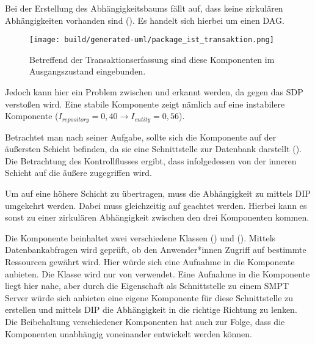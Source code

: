 Bei der Erstellung des Abhängigkeitsbaums fällt auf, dass keine zirkulären Abhängigkeiten vorhanden sind (). Es handelt sich hierbei um einen \ac{DAG}. 

\begin{figure}
  \centering
  \texttt{[image: build/generated-uml/package\_ist\_transaktion.png]}
   \caption{Betreffend der Transaktionserfassung sind diese Komponenten im Ausgangszustand eingebunden.}
   \label{fig:package_ist_transaktion}
\end{figure}

Jedoch kann hier ein Problem zwischen  und  erkannt werden, da gegen das \ac{SDP} verstoßen wird. Eine stabile Komponente zeigt nämlich auf eine instabilere Komponente ($I_{repository}=0,40 \rightarrow I_{entity}=0,56$). 

Betrachtet man  nach seiner Aufgabe, sollte sich die Komponente auf der äußersten Schicht befinden, da sie eine Schnittstelle zur Datenbank darstellt (). Die Betrachtung des Kontrollflusses ergibt, dass infolgedessen von der inneren Schicht  auf die äußere  zugegriffen wird.

Um  auf eine höhere Schicht zu übertragen, muss die Abhängigkeit zu  mittels \ac{DIP} umgekehrt werden. Dabei muss gleichzeitig auf  geachtet werden. Hierbei kann es sonst zu einer zirkulären Abhängigkeit zwischen den drei Komponenten kommen.

Die Komponente  beinhaltet zwei verschiedene Klassen  () und  (). Mittels Datenbankabfragen wird geprüft, ob den Anwender*innen Zugriff auf bestimmte Ressourcen gewährt wird. Hier würde sich eine Aufnahme in die Komponente  anbieten. Die Klasse  wird nur von  verwendet. Eine Aufnahme in die Komponente liegt hier nahe, aber durch die Eigenschaft als Schnittstelle zu einem SMPT Server würde sich anbieten eine eigene Komponente für diese Schnittstelle zu erstellen und mittels \ac{DIP} die Abhängigkeit in die richtige Richtung zu lenken. Die Beibehaltung verschiedener Komponenten hat auch zur Folge, dass die Komponenten unabhängig voneinander entwickelt werden können. 

